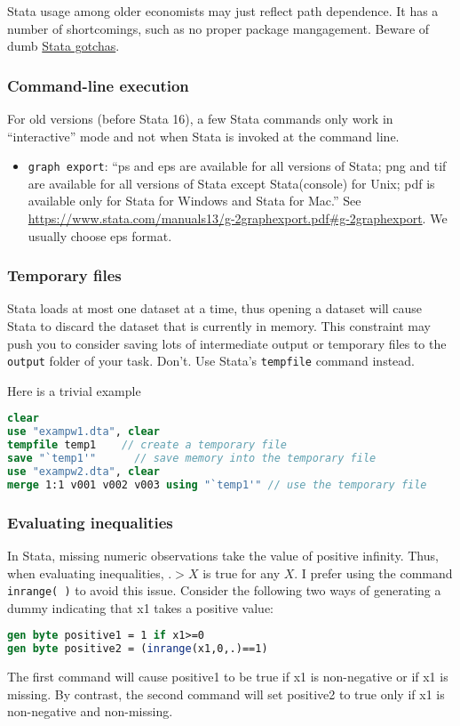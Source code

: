 Stata usage among older economists may just reflect path dependence.
It has a number of shortcomings, such as no proper package mangagement.
Beware of dumb \href{https://ifs.org.uk/docs/stata_gotchasJan2014.pdf}{Stata gotchas}.

\subsubsection{Command-line execution}

For old versions (before Stata 16), a few Stata commands only work in ``interactive'' mode and not when Stata is invoked at the command line.
\begin{itemize}
	\item \texttt{graph export}: 
	``ps and eps are available for all versions of Stata; png and tif are available for all versions of Stata except Stata(console) for Unix; pdf is available only for Stata for Windows and Stata for Mac.''
	See \url{https://www.stata.com/manuals13/g-2graphexport.pdf#g-2graphexport}.
	We usually choose eps format.
\end{itemize}


\subsubsection{Temporary files}
Stata loads at most one dataset at a time, 
thus opening a dataset will cause Stata to discard the dataset that is currently in memory.
This constraint may push you to consider saving lots of intermediate output or temporary files to the \texttt{output} folder of your task.
Don't.
Use Stata's \texttt{tempfile} command instead.

Here is a trivial example
\begin{lstlisting}[language=Stata]
clear
use "exampw1.dta", clear
tempfile temp1    // create a temporary file
save "`temp1'"      // save memory into the temporary file
use "exampw2.dta", clear
merge 1:1 v001 v002 v003 using "`temp1'" // use the temporary file
\end{lstlisting}

\subsubsection{Evaluating inequalities}
In Stata, missing numeric observations take the value of positive infinity.
Thus, when evaluating inequalities, $.>X$ is true for any $X$.
I prefer using the command \texttt{inrange( )} to avoid this issue.
Consider the following two ways of generating a dummy indicating that x1 takes a positive value:
\begin{lstlisting}[language=Stata]
gen byte positive1 = 1 if x1>=0
gen byte positive2 = (inrange(x1,0,.)==1)
\end{lstlisting}
The first command will cause positive1 to be true if x1 is non-negative or if x1 is missing.
By contrast, the second command will set positive2 to true only if x1 is non-negative and non-missing.
